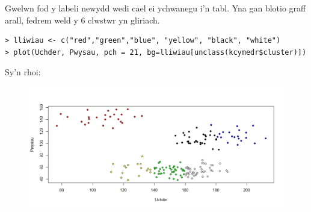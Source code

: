 Gwelwn fod y labeli newydd wedi cael ei ychwanegu i'n tabl. Yna gan blotio graff arall, fedrem weld y 6 clwstwr yn gliriach.

\begin{verbatim}
> lliwiau <- c("red","green","blue", "yellow", "black", "white")
> plot(Uchder, Pwysau, pch = 21, bg=lliwiau[unclass(kcymedr$cluster)])
\end{verbatim}

Sy'n rhoi:

\begin{figure}[H]
\begin{center}
\includegraphics[width=0.5\linewidth]{../img/6clwstwrR.jpeg}
\end{center}
\end{figure}


